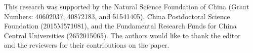 \documentclass[twocolumn]{svjour3}          \smartqed  \usepackage{graphicx}
\begin{document}
\begin{acknowledgements}
This research was supported by the Natural Science Foundation of China 
(Grant Numbers: 40602037, 40872183, and 51541405), China Postdoctoral Science Foundation 
(2015M571081), and the Fundamental Research Funds for China Central 
Universities (2652015065). The authors would like to thank the editor and 
the reviewers for their contributions on the paper. 
\end{acknowledgements}


          
\end{document}
